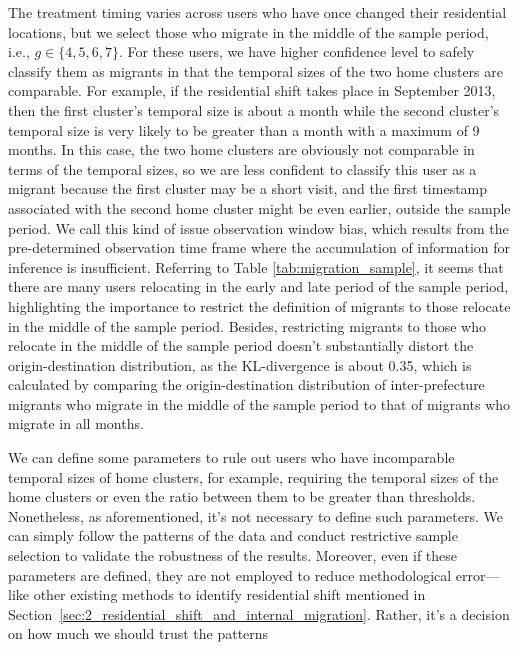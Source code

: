 The treatment timing varies across users who have once changed their residential locations, but we select those who migrate in the middle of the sample period, i.e., $g \in \{4,5,6,7\}$.
For these users, we have higher confidence level to safely classify them as migrants in that the temporal sizes of the two home clusters are comparable.
For example, if the residential shift takes place in September 2013, then the first cluster's temporal size is about a month while the second cluster's temporal size is very likely to be greater than a month with a maximum of 9 months.
In this case, the two home clusters are obviously not comparable in terms of the temporal sizes, so we are less confident to classify this user as a migrant because the first cluster may be a short visit, and the first timestamp associated with the second home cluster might be even earlier, outside the sample period.
We call this kind of issue observation window bias, which results from the pre-determined observation time frame where the accumulation of information for inference is insufficient.
Referring to Table \ref{tab:migration_sample}, it seems that there are many users relocating in the early and late period of the sample period, highlighting the importance to restrict the definition of migrants to those relocate in the middle of the sample period.
Besides, restricting migrants to those who relocate in the middle of the sample period doesn't substantially distort the origin-destination distribution, as the KL-divergence is about 0.35, which is calculated by comparing the origin-destination distribution of inter-prefecture migrants who migrate in the middle of the sample period to that of migrants who migrate in all months.

We can define some parameters to rule out users who have incomparable temporal sizes of home clusters, for example, requiring the temporal sizes of the home clusters or even the ratio between them to be greater than thresholds.
Nonetheless, as aforementioned, it's not necessary to define such parameters.
We can simply follow the patterns of the data and conduct restrictive sample selection to validate the robustness of the results.
Moreover, even if these parameters are defined, they are not employed to reduce methodological error—like other existing methods to identify residential shift mentioned in Section~\ref{sec:2_residential_shift_and_internal_migration}.
Rather, it's a decision on how much we should trust the patterns

